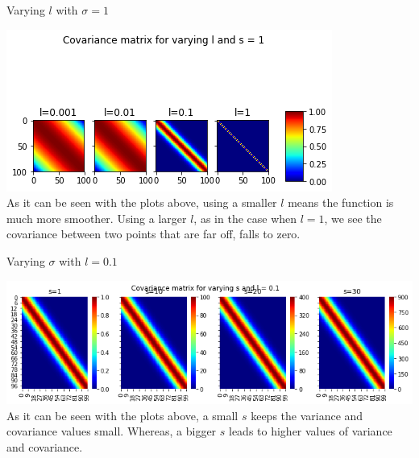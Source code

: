 \documentclass{beamer}
\begin{document}
\begin{frame}{Varying $l$ with $\sigma = 1$}
	\begin{center}
		\includegraphics[width=\linewidth, height=\textheight -120pt ,keepaspectratio]{gp/vary_l}\\
		As it can be seen with the plots above, using a smaller $l$ means the function is much more smoother. Using a larger $l$, as in the case when $l = 1$, we see the covariance between two points that are far off, falls to zero.
	\end{center}
	
\end{frame}

\begin{frame}{Varying $\sigma$ with $l = 0.1$}
	\begin{center}
		\includegraphics[width=\linewidth, height=\textheight -120pt ,keepaspectratio]{gp/vary_s}\\
		As it can be seen with the plots above, a small $s$ keeps the variance and covariance values small. Whereas, a bigger $s$ leads to higher values of variance and covariance.
	\end{center}
	
\end{frame}
\end{document}

